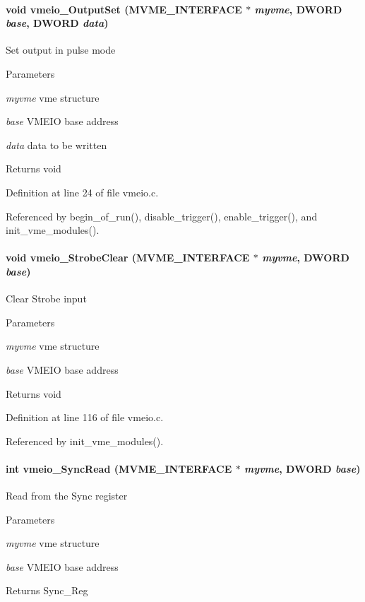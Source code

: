 \paragraph[{vmeio\_\-OutputSet}]{\setlength{\rightskip}{0pt plus 5cm}void vmeio\_\-OutputSet ({\bf MVME\_\-INTERFACE} $\ast$ {\em myvme}, \/  {\bf DWORD} {\em base}, \/  {\bf DWORD} {\em data})}\hfill\label{vmeio_8c_a411b07826fc5b2a611b6f4f9b8e4cc9d}
Set output in pulse mode 
\begin{DoxyParams}{Parameters}
\item[{\em myvme}]vme structure \item[{\em base}]VMEIO base address \item[{\em data}]data to be written \end{DoxyParams}
\begin{DoxyReturn}{Returns}
void 
\end{DoxyReturn}


Definition at line 24 of file vmeio.c.

Referenced by begin\_\-of\_\-run(), disable\_\-trigger(), enable\_\-trigger(), and init\_\-vme\_\-modules().
\paragraph[{vmeio\_\-StrobeClear}]{\setlength{\rightskip}{0pt plus 5cm}void vmeio\_\-StrobeClear ({\bf MVME\_\-INTERFACE} $\ast$ {\em myvme}, \/  {\bf DWORD} {\em base})}\hfill\label{vmeio_8c_a43ffc35999b9aebb9948bb7b7dd7e162}
Clear Strobe input 
\begin{DoxyParams}{Parameters}
\item[{\em myvme}]vme structure \item[{\em base}]VMEIO base address \end{DoxyParams}
\begin{DoxyReturn}{Returns}
void 
\end{DoxyReturn}


Definition at line 116 of file vmeio.c.

Referenced by init\_\-vme\_\-modules().
\paragraph[{vmeio\_\-SyncRead}]{\setlength{\rightskip}{0pt plus 5cm}int vmeio\_\-SyncRead ({\bf MVME\_\-INTERFACE} $\ast$ {\em myvme}, \/  {\bf DWORD} {\em base})}\hfill\label{vmeio_8c_a32066d5e2fc78836d5ac3dc4a70ac9af}
Read from the Sync register 
\begin{DoxyParams}{Parameters}
\item[{\em myvme}]vme structure \item[{\em base}]VMEIO base address \end{DoxyParams}
\begin{DoxyReturn}{Returns}
Sync\_\-Reg 
\end{DoxyReturn}


